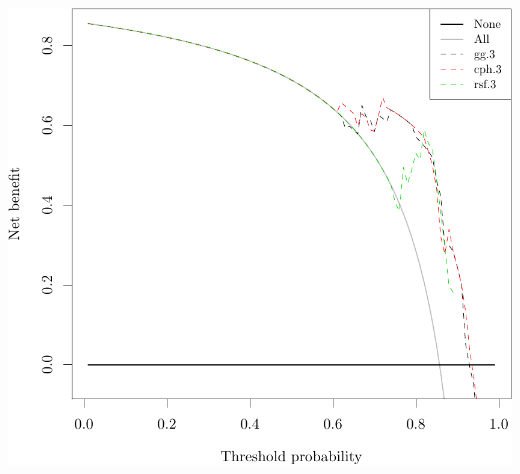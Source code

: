 \documentclass{article}\usepackage[]{graphicx}\usepackage[]{color}
\makeatletter
\def\maxwidth{ %
  \ifdim\Gin@nat@width>\linewidth
    \linewidth
  \else
    \Gin@nat@width
  \fi
}
\newenvironment{knitrout}{}{} %
\makeatother
\begin{document}
\begin{knitrout}
{\centering \includegraphics[width=\maxwidth]{figure/05-model-selection-dca-3} 

}



\end{knitrout}
\end{document}
